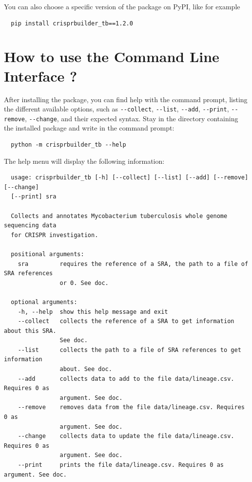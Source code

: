 \documentclass[twoside,a4paper,11pt,frenchb,openany]{report}
\begin{document}
You can also choose a specific version of the package on PyPI, like for example

\begin{verbatim}
  pip install crisprbuilder_tb==1.2.0
\end{verbatim}



    \section{How to use the Command Line Interface
?}\label{how-to-use-the-command-line-interface}

    After installing the package, you can find help with the command prompt,
listing the different available options, such as \texttt{-\/-collect},
\texttt{-\/-list}, \texttt{-\/-add}, \texttt{-\/-print},
\texttt{-\/-remove}, \texttt{-\/-change}, and their expected syntax.
Stay in the directory containing the installed package and write in the
command prompt:

    \begin{verbatim}
  python -m crisprbuilder_tb --help
\end{verbatim}

    The help menu will display the following information:

    \begin{verbatim}
  usage: crisprbuilder_tb [-h] [--collect] [--list] [--add] [--remove] [--change]
  [--print] sra

  Collects and annotates Mycobacterium tuberculosis whole genome sequencing data
  for CRISPR investigation.

  positional arguments:
    sra         requires the reference of a SRA, the path to a file of SRA references
                or 0. See doc.

  optional arguments:
    -h, --help  show this help message and exit
    --collect   collects the reference of a SRA to get information about this SRA. 
                See doc.
    --list      collects the path to a file of SRA references to get information 
                about. See doc.
    --add       collects data to add to the file data/lineage.csv. Requires 0 as 
                argument. See doc.
    --remove    removes data from the file data/lineage.csv. Requires 0 as 
                argument. See doc.
    --change    collects data to update the file data/lineage.csv. Requires 0 as
                argument. See doc.
    --print     prints the file data/lineage.csv. Requires 0 as argument. See doc.
\end{verbatim}
\end{document}
